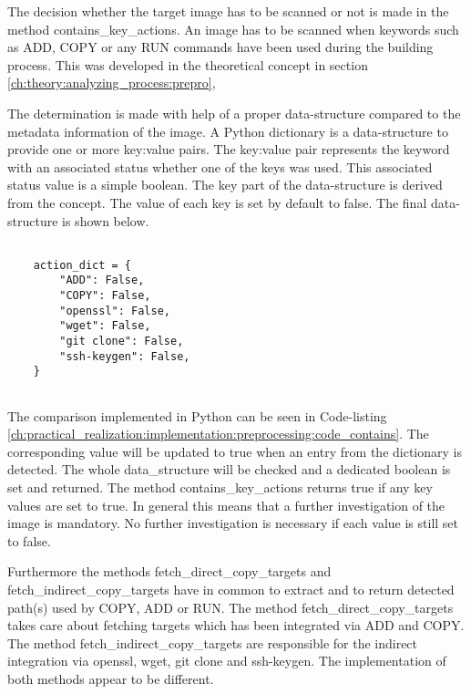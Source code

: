 The decision whether the target image has to be scanned or not is made in the method contains\_key\_actions.
An image has to be scanned when keywords such as ADD, COPY or any RUN commands have been used during the building process. 
This was developed in the theoretical concept in section \ref{ch:theory:analyzing_process:prepro}, 

The determination is made with help of a proper data-structure compared to the metadata information of the image.
A Python dictionary is a data-structure to provide one or more key:value pairs.
The key:value pair represents the keyword with an associated status whether one of the keys was used. 
This associated status value is a simple boolean.
The key part of the data-structure is derived from the concept. 
The value of each key is set by default to false. 
The final data-structure is shown below.
\lstset{language=Python}          %
\begin{lstlisting}[]  % Start your code-block
	
    action_dict = {
        "ADD": False,
        "COPY": False,
        "openssl": False,
        "wget": False,
        "git clone": False,
        "ssh-keygen": False,
    }
    
\end{lstlisting}
The comparison implemented in Python can be seen in Code-listing \ref{ch:practical_realization:implementation:preprocessing:code_contains}. 
The corresponding value will be updated to true when an entry from the dictionary is detected. 
The whole data\_structure will be checked and a dedicated boolean is set and returned. 
The method contains\_key\_actions returns true if any key values are set to true. 
In general this means that a further investigation of the image is mandatory. 
No further investigation is necessary if each value is still set to false.

Furthermore the methods fetch\_direct\_copy\_targets and fetch\_indirect\_copy\_targets have in common to extract and to return detected path(s) used by COPY, ADD or RUN. 
The method fetch\_direct\_copy\_targets takes care about fetching targets which has been integrated via ADD and COPY. 
The method fetch\_indirect\_copy\_targets are responsible for the indirect integration via openssl, wget, git clone and ssh-keygen. 
The implementation of both methods appear to be different.

